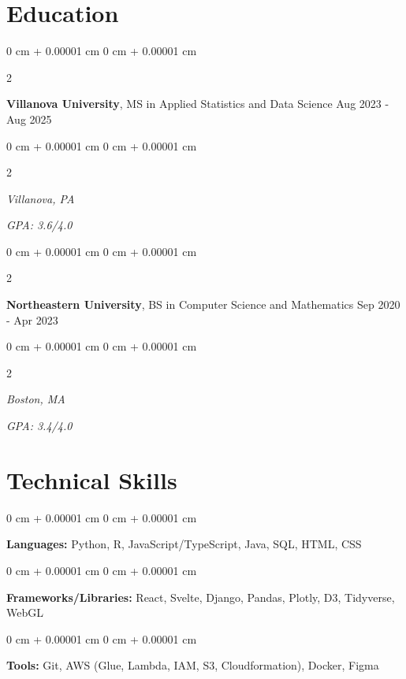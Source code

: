 \documentclass[10pt, letterpaper]{article}
\newenvironment{onecolentry}{
    \begin{adjustwidth}{
        0 cm + 0.00001 cm
    }{
        0 cm + 0.00001 cm
    }
}{
    \end{adjustwidth}
} %
\newenvironment{twocolentry}[2][]{
    \onecolentry
    \def\secondColumn{#2}
    \setcolumnwidth{\fill, 4.5 cm}
    \begin{paracol}{2}
}{
    \switchcolumn \raggedleft \secondColumn
    \end{paracol}
    \endonecolentry
} %
\begin{document}
    \section{Education}
    \begin{twocolentry}{
        Aug 2023 - Aug 2025
    }
    \textbf{Villanova University}, MS in Applied Statistics and Data Science \end{twocolentry}
    \begin{twocolentry}{
        \textit{GPA: 3.6/4.0}
    }
    \textit{Villanova, PA}
    \end{twocolentry}
    \vspace{0.2 cm}
    \begin{twocolentry}{
        Sep 2020 - Apr 2023
    }
    \textbf{Northeastern University}, BS in Computer Science and Mathematics \end{twocolentry}
    \begin{twocolentry}{
        \textit{GPA: 3.4/4.0}
    }
    \textit{Boston, MA}
    \end{twocolentry}

    \section{Technical Skills}
    \begin{onecolentry}
      \textbf{Languages:} Python, R, JavaScript/TypeScript, Java, SQL, HTML, CSS
    \end{onecolentry}
    \begin{onecolentry}
      \textbf{Frameworks/Libraries:} React, Svelte, Django, Pandas, Plotly, D3, Tidyverse, WebGL
    \end{onecolentry}
    \begin{onecolentry}
      \textbf{Tools:} Git, AWS (Glue, Lambda, IAM, S3, Cloudformation), Docker, Figma
    \end{onecolentry}
\end{document}
